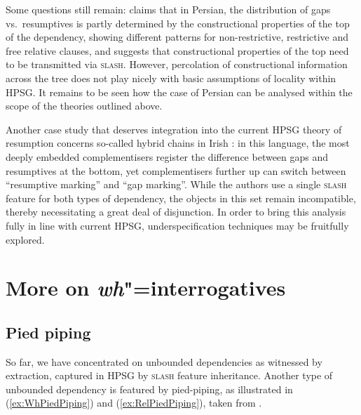 \documentclass[output=paper
                ,modfonts
                ,nonflat
	        ,collection
	        ,collectionchapter
	        ,collectiontoclongg
 	        ,biblatex
                ,babelshorthands
                ,newtxmath
                ,draftmode
                ,colorlinks, citecolor=brown
]{./langsci/langscibook}
\begin{document}
{Some questions still remain: \citet{taghvaipour:phd:05}\addpages claims that in
Persian, the distribution of gaps vs.\ resumptives is partly
determined by the constructional properties of the top of the
dependency, showing different patterns for non-restrictive,
restrictive and free relative clauses, and suggests that
constructional properties of the top need to be transmitted via
\textsc{slash}.  However, percolation of constructional information
across the tree does not play nicely with basic assumptions
of locality within HPSG. It remains to be seen how the case of Persian
can be analysed within the scope of the theories outlined above.

Another case study that deserves integration into the current HPSG
theory of resumption concerns so-called hybrid chains in Irish
\citep{assmann10:_does_chain_hybrid_irish_suppor}: in this language,
the most deeply embedded complementisers register the difference
between gaps and resumptives at the bottom, yet complementisers
further up can switch between ``resumptive marking'' and ``gap
marking''. While the authors use a single \textsc{slash} feature for
both types of dependency, the objects in this set remain incompatible,
thereby necessitating a great deal of disjunction. In order to bring
this analysis fully in line with current HPSG, underspecification
techniques may be fruitfully explored.



\section{More on \emph{wh}"=interrogatives}
\label{sec:UDC:MoreWh}

\subsection{Pied piping}

So far, we have concentrated on unbounded dependencies as witnessed by
extraction, captured in HPSG by \textsc{slash} feature
inheritance. Another type of unbounded dependency is featured by
pied-piping, as illustrated in (\ref{ex:WhPiedPiping}) and
(\ref{ex:RelPiedPiping}), taken from \citet{Ginzburg:Sag:01}\addpages.

}
\end{document}
